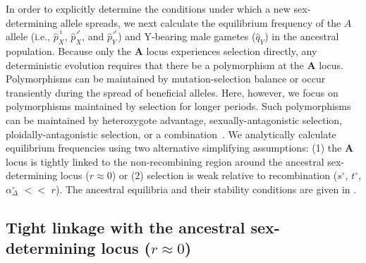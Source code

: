 \documentclass[10pt,letterpaper]{article}
\providecommand{\DIFdelbegin}{} %
\providecommand{\DIFdelend}{} %
\begin{document}
In order to explicitly determine the conditions under which a new sex-determining allele spreads, we next calculate the equilibrium frequency of the $A$ allele (i.e., $\hat{p}^\female_X$, $\hat{p}^\male_X$, and $\hat{p}^\male_Y$) and Y-bearing male gametes ($\hat{q}_{Y}$) in the ancestral population. 
Because only the $\mathbf{A}$ locus experiences selection directly, any deterministic evolution requires that there be a polymorphism at the $\mathbf{A}$ locus. 
Polymorphisms can be maintained by mutation-selection balance or occur transiently during the spread of beneficial alleles. 
Here, however, we focus on polymorphisms maintained by selection for longer periods. 
Such polymorphisms can be maintained by heterozygote advantage, sexually-antagonistic selection, ploidally-antagonistic selection, or a combination~\cite{Immler:2012tl}.
We analytically calculate equilibrium frequencies using two alternative simplifying assumptions: 
(1) the $\mathbf{A}$ locus is tightly linked to the non-recombining region around the ancestral sex-determining locus ($r \approx 0$) or (2) selection is weak relative to recombination ($s^\circ$, $t^\circ$, $\alpha_{\Delta}^\circ$ $<<$ $r$).
The ancestral equilibria and their stability conditions are given in . 

\DIFdelbegin %

\DIFdelend \subsection*{Tight linkage with the ancestral sex-determining locus ($r \approx 0$)}
\end{document}

